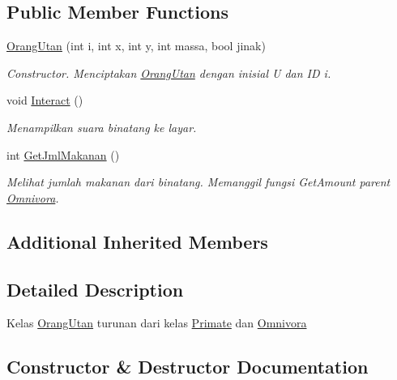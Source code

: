\subsection*{Public Member Functions}
\begin{DoxyCompactItemize}
\item 
\hyperlink{classOrangUtan_a397ebb2cede26ace5418e51486324379}{Orang\+Utan} (int i, int x, int y, int massa, bool jinak)
\begin{DoxyCompactList}\small\item\em Constructor. Menciptakan \hyperlink{classOrangUtan}{Orang\+Utan} dengan inisial \textquotesingle{}U\textquotesingle{} dan ID i. \end{DoxyCompactList}\item 
void \hyperlink{classOrangUtan_a860cabed6d5a6d659b9faee88ed8341b}{Interact} ()\hypertarget{classOrangUtan_a860cabed6d5a6d659b9faee88ed8341b}{}\label{classOrangUtan_a860cabed6d5a6d659b9faee88ed8341b}

\begin{DoxyCompactList}\small\item\em Menampilkan suara binatang ke layar. \end{DoxyCompactList}\item 
int \hyperlink{classOrangUtan_ac1e2890d346b10b9235e1ee2f8d22d79}{Get\+Jml\+Makanan} ()
\begin{DoxyCompactList}\small\item\em Melihat jumlah makanan dari binatang. Memanggil fungsi Get\+Amount parent \hyperlink{classOmnivora}{Omnivora}. \end{DoxyCompactList}\end{DoxyCompactItemize}
\subsection*{Additional Inherited Members}


\subsection{Detailed Description}
Kelas \hyperlink{classOrangUtan}{Orang\+Utan} turunan dari kelas \hyperlink{classPrimate}{Primate} dan \hyperlink{classOmnivora}{Omnivora} 

\subsection{Constructor \& Destructor Documentation}
